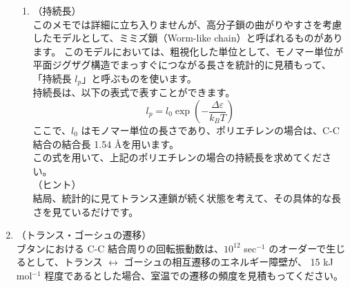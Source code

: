 \documentclass[a4paper,11pt]{jlreq}
\begin{document}
\begin{enumerate}
\begin{enumerate}
			\item
			\label{it:2-5}
			（持続長）\\
			このメモでは詳細に立ち入りませんが、高分子鎖の曲がりやすさを考慮したモデルとして、ミミズ鎖（Worm-like chain）と呼ばれるものがあります。
			このモデルにおいては、粗視化した単位として、モノマー単位が平面ジグザグ構造でまっすぐにつながる長さを統計的に見積もって、
			「持続長 $l_p$」と呼ぶものを使います。\\
			持続長は、以下の表式で表すことができます。
			\begin{equation*}
			l_p = l_0 \exp \left( - \dfrac{\Delta \varepsilon}{k_B T} \right)
			\end{equation*}
			ここで、$l_0$ はモノマー単位の長さであり、ポリエチレンの場合は、C-C 結合の結合長 1.54 \AA を用います。\\
			この式を用いて、上記のポリエチレンの場合の持続長を求めてください。\\
			（ヒント）\\
			結局、統計的に見てトランス連鎖が続く状態を考えて、その具体的な長さを見ているだけです。
	\end{enumerate}
	\item
	\label{it:2-6}
	（トランス・ゴーシュの遷移）\\
	ブタンにおける C-C 結合周りの回転振動数は、$10^{12}$ sec$^{-1}$ のオーダーで生じるとして、トランス $\leftrightarrow$ ゴーシュの相互遷移のエネルギー障壁が、
	15 kJ mol$^{-1}$ 程度であるとした場合、室温での遷移の頻度を見積もってください。
\end{enumerate}
\end{document}
